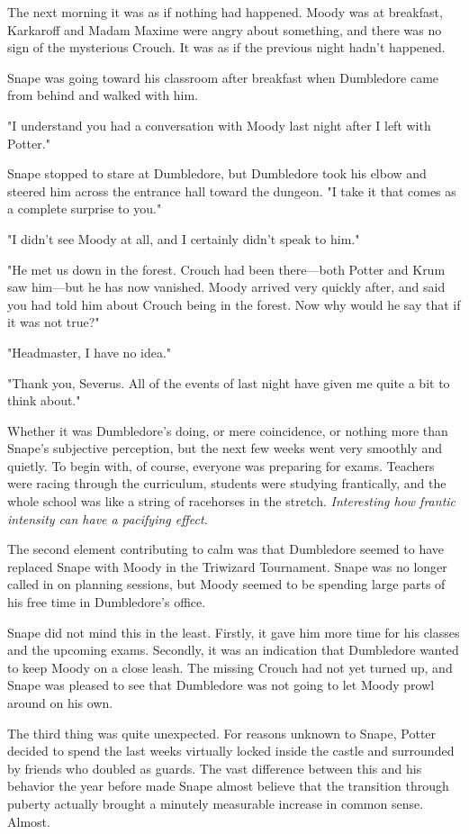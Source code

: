 The next morning it was as if nothing had happened. Moody was at breakfast, Karkaroff and Madam Maxime were angry about something, and there was no sign of the mysterious Crouch. It was as if the previous night hadn't happened.

Snape was going toward his classroom after breakfast when Dumbledore came from behind and walked with him.

"I understand you had a conversation with Moody last night after I left with Potter."

Snape stopped to stare at Dumbledore, but Dumbledore took his elbow and steered him across the entrance hall toward the dungeon. "I take it that comes as a complete surprise to you."

"I didn't see Moody at all, and I certainly didn't speak to him."

"He met us down in the forest. Crouch had been there—both Potter and Krum saw him—but he has now vanished. Moody arrived very quickly after, and said you had told him about Crouch being in the forest. Now why would he say that if it was not true?"

"Headmaster, I have no idea."

"Thank you, Severus. All of the events of last night have given me quite a bit to think about."

Whether it was Dumbledore's doing, or mere coincidence, or nothing more than Snape's subjective perception, but the next few weeks went very smoothly and quietly. To begin with, of course, everyone was preparing for exams. Teachers were racing through the curriculum, students were studying frantically, and the whole school was like a string of racehorses in the stretch. \emph{Interesting how frantic intensity can have a pacifying effect.}

The second element contributing to calm was that Dumbledore seemed to have replaced Snape with Moody in the Triwizard Tournament. Snape was no longer called in on planning sessions, but Moody seemed to be spending large parts of his free time in Dumbledore's office.

Snape did not mind this in the least. Firstly, it gave him more time for his classes and the upcoming exams. Secondly, it was an indication that Dumbledore wanted to keep Moody on a close leash. The missing Crouch had not yet turned up, and Snape was pleased to see that Dumbledore was not going to let Moody prowl around on his own.

The third thing was quite unexpected. For reasons unknown to Snape, Potter decided to spend the last weeks virtually locked inside the castle and surrounded by friends who doubled as guards. The vast difference between this and his behavior the year before made Snape almost believe that the transition through puberty actually brought a minutely measurable increase in common sense. Almost.

